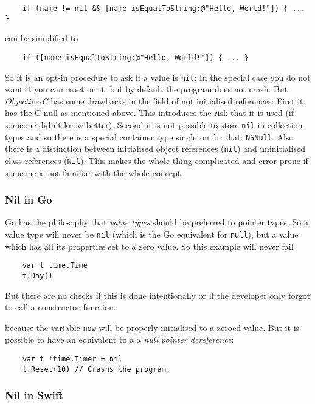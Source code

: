 \documentclass[a4paper,12pt]{report}
\begin{document}
\begin{verbatim}
    if (name != nil && [name isEqualToString:@"Hello, World!"]) { ... }
\end{verbatim}

\noindent can be simplified to

\begin{verbatim}
    if ([name isEqualToString:@"Hello, World!"]) { ... }
\end{verbatim}

\noindent So it is an opt-in procedure to ask if a value is \verb|nil|: In the special case you do not want it you can react on it, but by default the program does not crash. But \textit{Objective-C} has some drawbacks in the field of not initialised references: First it has the C null as mentioned above. This introduces the risk that it is used (if someone didn't know better). Second it is not possible to store \verb|nil| in collection types and so there is a special container type singleton for that: \verb|NSNull|. Also there is a distinction between initialised object references (\verb|nil|) and uninitialised class references (\verb|Nil|). This makes the whole thing complicated and error prone if someone is not familiar with the whole concept.

\subsubsection{Nil in Go}
Go has the philosophy that \textit{value types} should be preferred to pointer types. So a value type will never be \verb|nil| (which is the Go equivalent for \verb|null|), but a value which has all its properties set to a zero value\cite{golang-spec}. So this example will never fail

\begin{verbatim}
    var t time.Time
    t.Day()
\end{verbatim}

But there are no checks if this is done intentionally or if the developer only forgot to call a constructor function.

because the variable \verb|now| will be properly initialised to a zeroed value. But it is possible to have an equivalent to a a \textit{null pointer dereference}:

\begin{verbatim}
    var t *time.Timer = nil
    t.Reset(10) // Crashs the program.
\end{verbatim}

\subsubsection{Nil in Swift}
\end{document}
